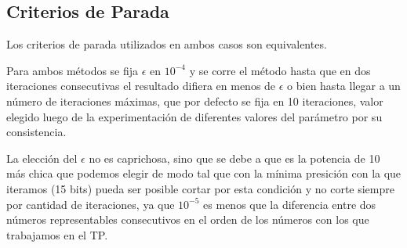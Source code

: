 \subsection{Criterios de Parada}	

Los criterios de parada utilizados en ambos casos son equivalentes.

Para ambos m\'etodos se fija $\epsilon$ en $10^{-4}$ y se corre el m\'etodo 
hasta que en dos iteraciones consecutivas el resultado difiera en menos de 
$\epsilon$ o bien hasta llegar a un n\'umero de iteraciones m\'aximas, 
que por defecto se fija en 10 iteraciones, valor elegido luego de la 
experimentaci\'on de diferentes valores del par\'ametro por su consistencia.

La elecci\'on del $\epsilon$ no es caprichosa, sino que se debe a que es la 
potencia de 10 m\'as chica que podemos elegir de modo tal que con la m\'inima 
presici\'on con la que iteramos (15 bits) pueda ser posible cortar por esta 
condici\'on y no corte siempre por cantidad de iteraciones, ya que 
$10^{-5}$ es menos que la diferencia entre dos n\'umeros representables 
consecutivos en el orden de los n\'umeros con los que trabajamos en el TP.
